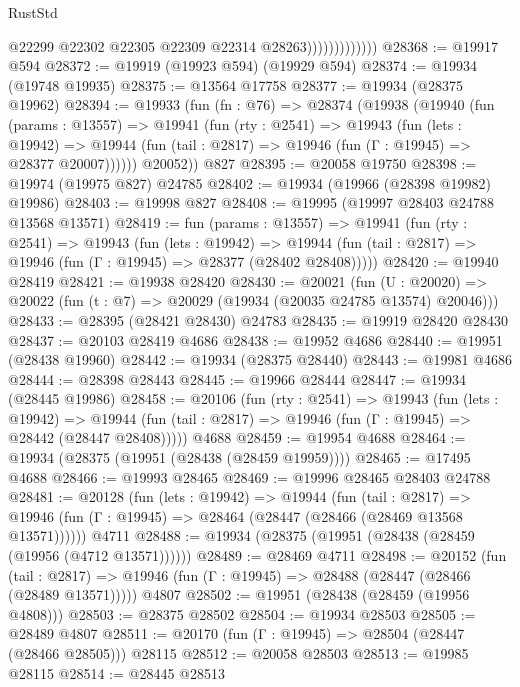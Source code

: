 \begin{lexlean}{RustStd}
\begin{coremodule}
                              @22299
                              @22302
                              @22305
                              @22309
                              @22314
                              @28263)))))))))))))
@28368 := @19917 @594
@28372 := @19919 (@19923 @594) (@19929 @594)
@28374 := @19934 (@19748 @19935)
@28375 := @13564 @17758
@28377 := @19934 (@28375 @19962)
@28394 := @19933
    (fun (fn : @76) =>
    @28374
      (@19938
        (@19940
          (fun (params : @13557) =>
          @19941
            (fun (rty : @2541) =>
            @19943
              (fun (lets : @19942) =>
              @19944 (fun (tail : @2817) => @19946 (fun (Γ : @19945) => @28377 @20007))))))
        @20052))
    @827
@28395 := @20058 @19750
@28398 := @19974 (@19975 @827) @24785
@28402 := @19934 (@19966 (@28398 @19982) @19986)
@28403 := @19998 @827
@28408 := @19995 (@19997 @28403 @24788 @13568 @13571)
@28419 := fun (params : @13557) =>
  @19941
    (fun (rty : @2541) =>
    @19943
      (fun (lets : @19942) =>
      @19944 (fun (tail : @2817) => @19946 (fun (Γ : @19945) => @28377 (@28402 @28408)))))
@28420 := @19940 @28419
@28421 := @19938 @28420
@28430 := @20021
    (fun (U : @20020) => @20022 (fun (t : @7) => @20029 (@19934 (@20035 @24785 @13574) @20046)))
@28433 := @28395 (@28421 @28430) @24783
@28435 := @19919 @28420 @28430
@28437 := @20103 @28419 @4686
@28438 := @19952 @4686
@28440 := @19951 (@28438 @19960)
@28442 := @19934 (@28375 @28440)
@28443 := @19981 @4686
@28444 := @28398 @28443
@28445 := @19966 @28444
@28447 := @19934 (@28445 @19986)
@28458 := @20106
    (fun (rty : @2541) =>
    @19943
      (fun (lets : @19942) =>
      @19944 (fun (tail : @2817) => @19946 (fun (Γ : @19945) => @28442 (@28447 @28408)))))
    @4688
@28459 := @19954 @4688
@28464 := @19934 (@28375 (@19951 (@28438 (@28459 @19959))))
@28465 := @17495 @4688
@28466 := @19993 @28465
@28469 := @19996 @28465 @28403 @24788
@28481 := @20128
    (fun (lets : @19942) =>
    @19944
      (fun (tail : @2817) =>
      @19946 (fun (Γ : @19945) => @28464 (@28447 (@28466 (@28469 @13568 @13571))))))
    @4711
@28488 := @19934 (@28375 (@19951 (@28438 (@28459 (@19956 (@4712 @13571))))))
@28489 := @28469 @4711
@28498 := @20152
    (fun (tail : @2817) => @19946 (fun (Γ : @19945) => @28488 (@28447 (@28466 (@28489 @13571)))))
    @4807
@28502 := @19951 (@28438 (@28459 (@19956 @4808)))
@28503 := @28375 @28502
@28504 := @19934 @28503
@28505 := @28489 @4807
@28511 := @20170 (fun (Γ : @19945) => @28504 (@28447 (@28466 @28505))) @28115
@28512 := @20058 @28503
@28513 := @19985 @28115
@28514 := @28445 @28513

\end{coremodule}
\end{lexlean}
